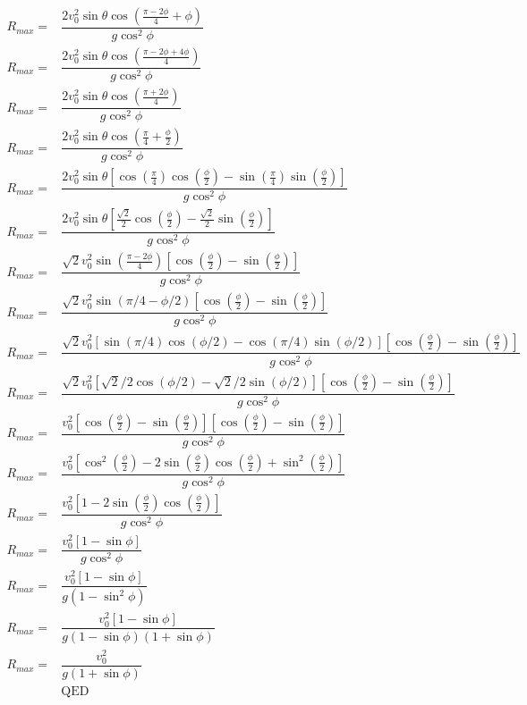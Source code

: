 \documentclass[12pt, a4paper]{article}
\begin{document}
\begin{align*}
R_{max} =& \dfrac{2v_0^2\sin\theta\cos(\frac{\pi-2\phi}{4}+\phi)}{g\cos^2\phi}
\\
R_{max} =& \dfrac{2v_0^2\sin\theta\cos(\frac{\pi-2\phi+4\phi}{4})}{g\cos^2\phi}
\\
R_{max} =& \dfrac{2v_0^2\sin\theta\cos(\frac{\pi+2\phi}{4})}{g\cos^2\phi}
\\
R_{max} =& \dfrac{2v_0^2\sin\theta\cos(
\frac{\pi}{4} + 
\frac{\phi}{2}
)}{g\cos^2\phi}
\\
R_{max} =& \dfrac{2v_0^2\sin\theta
[\cos(\frac{\pi}{4})
\cos(\frac{\phi}{2}) -
\sin(\frac{\pi}{4})
\sin(\frac{\phi}{2})]
}{g\cos^2\phi}
\\
R_{max} =& \dfrac{2v_0^2\sin\theta
[\frac{\sqrt{2}}{2}
\cos(\frac{\phi}{2}) -
\frac{\sqrt{2}}{2}
\sin(\frac{\phi}{2})]
}{g\cos^2\phi}
\\
R_{max} =& \dfrac{\sqrt{2}v_0^2\sin(\frac{\pi-2\phi}{4})
[\cos(\frac{\phi}{2}) - \sin(\frac{\phi}{2})]
}{g\cos^2\phi}
\\
R_{max} =& \dfrac{\sqrt{2}v_0^2
\sin(\pi/4-\phi/2)
[\cos(\frac{\phi}{2}) - \sin(\frac{\phi}{2})]
}{g\cos^2\phi}
\\
R_{max} =& \dfrac{\sqrt{2}v_0^2
[\sin(\pi/4)
\cos(\phi/2) -
\cos(\pi/4)
\sin(\phi/2)]
[\cos(\frac{\phi}{2}) - \sin(\frac{\phi}{2})]
}{g\cos^2\phi}
\\
R_{max} =& \dfrac{\sqrt{2}v_0^2
[\sqrt{2}/2
\cos(\phi/2) -
\sqrt{2}/2
\sin(\phi/2)]
[\cos(\frac{\phi}{2}) - \sin(\frac{\phi}{2})]
}{g\cos^2\phi}
\\
R_{max} =& \dfrac{v_0^2
[\cos(\frac{\phi}{2}) - \sin(\frac{\phi}{2})]
[\cos(\frac{\phi}{2}) - \sin(\frac{\phi}{2})]
}{g\cos^2\phi}
\\
R_{max} =& \dfrac{v_0^2
[\cos^2(\frac{\phi}{2}) - 2\sin(\frac{\phi}{2})\cos(\frac{\phi}{2})+
\sin^2(\frac{\phi}{2})]
}{g\cos^2\phi}
\\
R_{max} =& \dfrac{v_0^2
[1 - 2\sin(\frac{\phi}{2})\cos(\frac{\phi}{2})]
}{g\cos^2\phi}
\\
R_{max} =& \dfrac{v_0^2
[1 - \sin\phi]
}{g\cos^2\phi}
\\
R_{max} =& \dfrac{v_0^2
[1 - \sin\phi]
}{g(1-\sin^2\phi)}
\\
R_{max} =& \dfrac{v_0^2
[1 - \sin\phi]
}{g(1-\sin\phi)(1+\sin\phi)}
\\
R_{max} =& \boxed{\dfrac{v_0^2}{g(1+\sin\phi)}}
\\
&\text{QED}
\end{align*}
\end{document}
